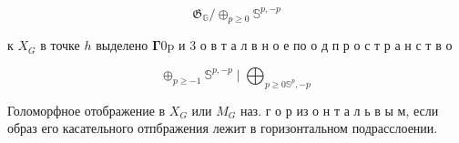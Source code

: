 \documentclass[10pt]{article}
\begin{document}
\[

\mathfrak{G}_{\mathbb{G}} / \oplus_{p \geqslant 0} \mathbb{S}^{p,-p}

\]



к $X_{G}$ в точке $h$ выделено $\mathbf{\Gamma} 0 \mathrm{p}$ и 3 о в т а л в н о е по о д п р о с т р а н с т в о



\[

\oplus_{p \geqslant-1} \mathbb{S}^{p,-p} \mid \bigoplus_{p \geqslant 0 \mathbb{S}^{p},-p}

\]



Голоморфное отображение в $X_{G}$ или $M_{G}$ наз. г о р из о н т а л ь в ы м, если образ его касательного отпбражения лежит в горизонтальном подрасслоении.
\end{document}
